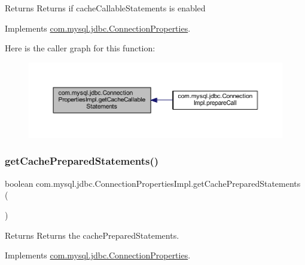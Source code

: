 \begin{DoxyReturn}{Returns}
Returns if cache\+Callable\+Statements is enabled 
\end{DoxyReturn}


Implements \mbox{\hyperlink{interfacecom_1_1mysql_1_1jdbc_1_1_connection_properties_a24408439f0eeff0fd5181509fa6b68d0}{com.\+mysql.\+jdbc.\+Connection\+Properties}}.

Here is the caller graph for this function\+:\nopagebreak
\begin{figure}[H]
\begin{center}
\leavevmode
\includegraphics[width=350pt]{classcom_1_1mysql_1_1jdbc_1_1_connection_properties_impl_a5e551ecbfcb75e6223467fc28ac3012b_icgraph}
\end{center}
\end{figure}
\mbox{\label{classcom_1_1mysql_1_1jdbc_1_1_connection_properties_impl_acb332b27c20f180f7f3ed71bf7d622f0}} 
\subsubsection{\texorpdfstring{get\+Cache\+Prepared\+Statements()}{getCachePreparedStatements()}}
{\footnotesize\ttfamily boolean com.\+mysql.\+jdbc.\+Connection\+Properties\+Impl.\+get\+Cache\+Prepared\+Statements (\begin{DoxyParamCaption}{ }\end{DoxyParamCaption})}

\begin{DoxyReturn}{Returns}
Returns the cache\+Prepared\+Statements. 
\end{DoxyReturn}


Implements \mbox{\hyperlink{interfacecom_1_1mysql_1_1jdbc_1_1_connection_properties_a74f3ae7b24eeb5ed44da99c60f664ac4}{com.\+mysql.\+jdbc.\+Connection\+Properties}}.

